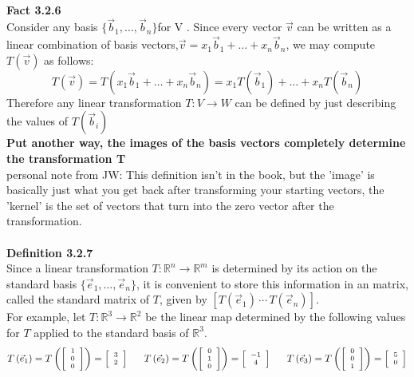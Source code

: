 \documentclass{article}
\begin{document}
\\
\textbf{Fact 3.2.6}\\
Consider any basis $\{\vec b_1,\dots,\vec b_n\}$for V . Since every vector $\vec{v}$ can be
written as a linear combination of basis vectors,$\vec v = x_1\vec b_1+\dots+ x_n\vec b_n$, we may
compute $T(\vec v)$ as follows:
\begin{equation*}
T(\vec v)=T(x_1\vec b_1+\dots+ x_n\vec b_n)=
x_1T(\vec b_1)+\dots+x_nT(\vec b_n)
\end{equation*}
Therefore any linear transformation $T:V \rightarrow W$ can be defined by just describing the values of $T(\vec b_i)$\\
\textbf{Put another way, the images of the basis vectors completely determine the transformation T}\\
personal note from JW: This definition isn't in the book, but the 'image' is basically just what you get back after transforming your starting vectors, the 'kernel' is the set of vectors that turn into the zero vector after the transformation.\\
\\
\textbf{Definition 3.2.7}\\
Since a linear transformation $T:\mathbb{R}^n\to\mathbb{R}^m$ is determined by its action on the standard basis
$\{\vec e_1,\dots,\vec e_n\}$, it is convenient to store this information in an matrix, called the standard matrix of $T$, given by
$[T(\vec e_1) \,\cdots\, T(\vec e_n)]$.\\
For example, let $T:\mathbb{R}^3\to\mathbb{R}^2$  be the linear map determined by the following values for $T$ applied to the standard basis of $\mathbb{R}^3$.\\
\begin{equation*}
\scriptsize
T\left(\vec e_1 \right)
=
T\left(\left[\begin{array}{c} 1 \\ 0 \\ 0 \end{array}\right] \right)
=
\left[\begin{array}{c} 3 \\ 2\end{array}\right]
\hspace{2em}
T\left(\vec e_2 \right)
=
T\left(\left[\begin{array}{c} 0 \\ 1 \\ 0 \end{array}\right] \right)
=
\left[\begin{array}{c} -1 \\ 4\end{array}\right]
\hspace{2em}
T\left(\vec e_3 \right)
=
T\left(\left[\begin{array}{c} 0 \\ 0 \\ 1 \end{array}\right] \right)
=
\left[\begin{array}{c} 5 \\ 0\end{array}\right]
\end{equation*}
\end{document}
